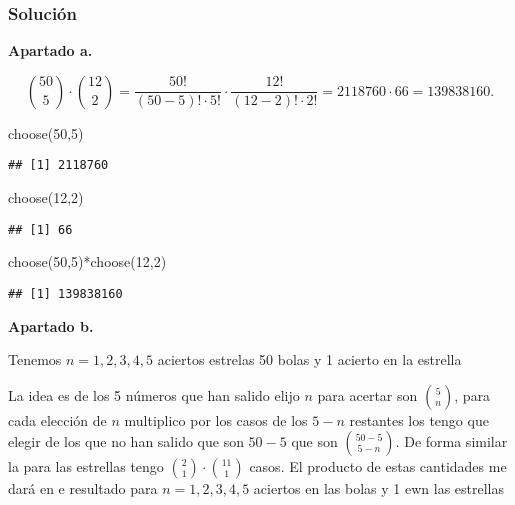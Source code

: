 \documentclass[
]{article}
\newenvironment{Shaded}{\begin{snugshade}}{\end{snugshade}}
\newcommand{\DecValTok}[1]{\textcolor[rgb]{0.00,0.00,0.81}{#1}}
\newcommand{\FunctionTok}[1]{\textcolor[rgb]{0.00,0.00,0.00}{#1}}
\newcommand{\NormalTok}[1]{#1}
\newcommand{\SpecialCharTok}[1]{\textcolor[rgb]{0.00,0.00,0.00}{#1}}
\begin{document}
\hypertarget{soluciuxf3n-1}{%
\subsubsection{Solución}\label{soluciuxf3n-1}}

\textbf{Apartado a.}

\[
\binom{50}{5}\cdot \binom{12}{2} =
\frac{50!}{(50-5)!\cdot 5!}\cdot 
\frac{12!}{(12-2)!\cdot 2!}=
2118760\cdot 66=
139838160.
\]

\begin{Shaded}
\begin{Highlighting}[]
\FunctionTok{choose}\NormalTok{(}\DecValTok{50}\NormalTok{,}\DecValTok{5}\NormalTok{)}
\end{Highlighting}
\end{Shaded}

\begin{verbatim}
## [1] 2118760
\end{verbatim}

\begin{Shaded}
\begin{Highlighting}[]
\FunctionTok{choose}\NormalTok{(}\DecValTok{12}\NormalTok{,}\DecValTok{2}\NormalTok{)}
\end{Highlighting}
\end{Shaded}

\begin{verbatim}
## [1] 66
\end{verbatim}

\begin{Shaded}
\begin{Highlighting}[]
\FunctionTok{choose}\NormalTok{(}\DecValTok{50}\NormalTok{,}\DecValTok{5}\NormalTok{)}\SpecialCharTok{*}\FunctionTok{choose}\NormalTok{(}\DecValTok{12}\NormalTok{,}\DecValTok{2}\NormalTok{)}
\end{Highlighting}
\end{Shaded}

\begin{verbatim}
## [1] 139838160
\end{verbatim}

\textbf{Apartado b.}

Tenemos \(n=1,2,3,4,5\) aciertos estrelas 50 bolas y 1 acierto en la
estrella

La idea es de los 5 números que han salido elijo \(n\) para acertar son
\(\binom{5}{n}\), para cada elección de \(n\) multiplico por los casos
de los \(5-n\) restantes los tengo que elegir de los que no han salido
que son \(50-5\) que son \(\binom{50-5}{5-n}\). De forma similar la para
las estrellas tengo \(\binom{2}{1}\cdot \binom{11}{1}\) casos. El
producto de estas cantidades me dará en e resultado para \(n=1,2,3,4,5\)
aciertos en las bolas y 1 ewn las estrellas
\end{document}
